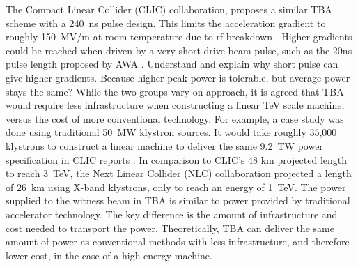 \documentclass{iitthesis}
\newcommand{\nrnote}[1]{\textsf{{\color{blue}{ NN note:}   #1 }}}
\begin{document}
The Compact Linear Collider (CLIC) collaboration, proposes a similar TBA scheme with
a \SI{240}{ns} pulse design. This limits the acceleration gradient
to roughly \SI{150}{MV/m} at room temperature due to rf breakdown \cite{CLICdesignReport}.
Higher gradients could be reached when driven by a very short drive
beam pulse, such as the 20ns pulse length proposed by AWA \cite{WeiPaper}. 
\nrnote{Understand and explain why short pulse can give higher gradients. 
Because higher peak power is tolerable, but average power stays the same?}
While the two groups vary on approach, it is agreed that TBA would 
require less infrastructure when constructing a linear TeV scale machine, 
versus the cost of more conventional technology. 
For example, a case study was done using traditional \SI{50}{MW} klystron sources.
It would take roughly 35,000 klystrons to construct a linear machine to deliver the same 
\SI{9.2}{TW} power specification in CLIC reports \cite{CLICdesignReport}. 
In comparison to CLIC's 48 km projected length to reach \SI{3}{TeV}, the Next Linear
Collider (NLC) collaboration projected a length of \SI{26}{km} using X-band klystrons,
only to reach an energy of \SI{1}{TeV}. %
The power supplied to the witness beam in TBA is similar to
power provided by traditional accelerator technology. 
The key difference is the amount of infrastructure and cost 
needed to transport the power. Theoretically, TBA can deliver
the same amount of power as conventional methods with less 
infrastructure, and therefore lower cost, in the case of a high energy machine. 
\end{document}
